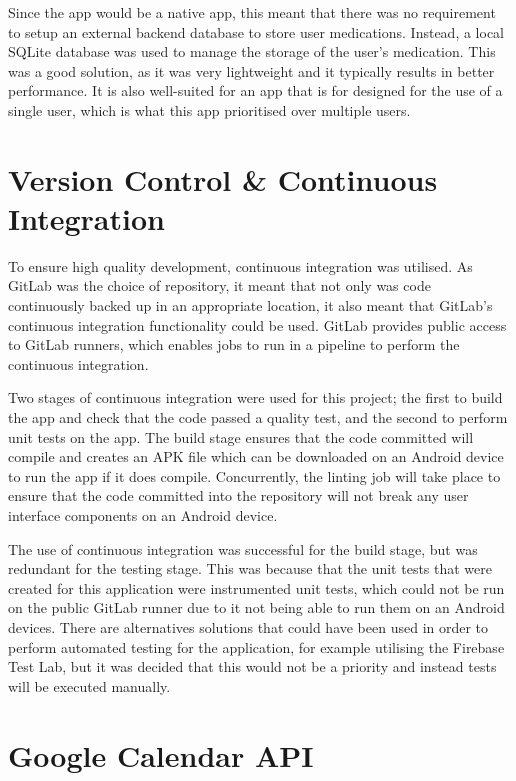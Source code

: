 \documentclass{l4proj}
\begin{document}
Since the app would be a native app, this meant that there was no requirement to setup an external backend database to store user medications. Instead, a local SQLite database was used to manage the storage of the user's medication. This was a good solution, as it was very lightweight and it typically results in better performance. It is also well-suited for an app that is for designed for the use of a single user, which is what this app prioritised over multiple users. 

\section{Version Control \& Continuous Integration}

To ensure high quality development, continuous integration was utilised. As GitLab was the choice of repository, it meant that not only was code continuously backed up in an appropriate location, it also meant that GitLab's continuous integration functionality could be used. GitLab provides public access to GitLab runners, which enables jobs to run in a pipeline to perform the continuous integration.

Two stages of continuous integration were used for this project; the first to build the app and check that the code passed a quality test, and the second to perform unit tests on the app. The build stage ensures that the code committed will  compile and creates an APK file which can be downloaded on an Android device to run the app if it does compile. Concurrently, the linting job will take place to ensure that the code committed into the repository will not break any user interface components on an Android device.

The use of continuous integration was successful for the build stage, but was redundant for the testing stage. This was because that the unit tests that were created for this application were instrumented unit tests, which could not be run on the public GitLab runner due to it not being able to run them on an Android devices. There are alternatives solutions that could have been used in order to perform automated testing for the application, for example utilising the Firebase Test Lab, but it was decided that this would not be a priority and instead tests will be executed manually.

\section{Google Calendar API}
\end{document}
